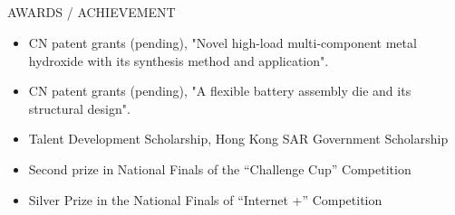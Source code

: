 \documentclass{my_cv}
\begin{document}
\begin{multicols}{2}
\section{\faStar}{AWARDS / ACHIEVEMENT}
\begin{itemize}[noitemsep]
    \item CN patent grants (pending), "Novel high-load multi-component metal hydroxide with its synthesis method and application".
    \item CN patent grants (pending), "A flexible battery
assembly die and its structural design".
    \item Talent Development Scholarship, Hong Kong SAR Government Scholarship
    \item Second prize in National Finals of the “Challenge Cup” Competition
    \item Silver Prize in the National Finals of “Internet +” Competition
\end{itemize}

\end{multicols}
\end{document}
